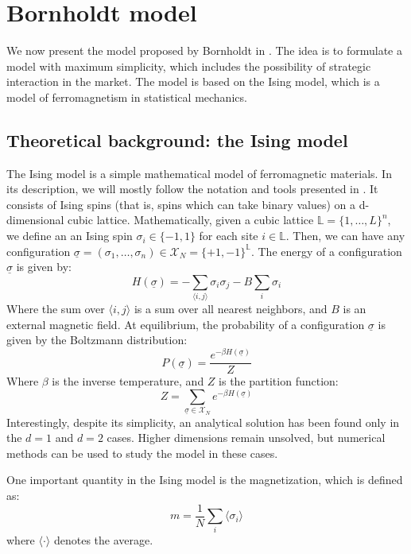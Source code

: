 \chapter{Bornholdt model}\label{ch:chapter2}
We now present the model proposed by Bornholdt in \cite{bornholdt}. The idea is to formulate a model with maximum simplicity, which includes the possibility of strategic interaction in the market. The model is based on the Ising model, which is a model of ferromagnetism in statistical mechanics.

\section{Theoretical background: the Ising model}
The Ising model is a simple mathematical model of ferromagnetic materials. In its description, we will mostly follow the notation and tools presented in \cite{mezard_book}. It consists of Ising spins (that is, spins which can take binary values) on a d-dimensional cubic lattice. Mathematically, given a cubic lattice $\mathbb{L}=\{1,\dots,L\}^n$, we define an an Ising spin $\sigma_i\in\{-1,1\}$ for each site $i\in\mathbb{L}$. Then, we can have any configuration $\underline{\sigma} = (\sigma_1,\dots,\sigma_n) \in \mathcal{X}_N=\{+1,-1\}^{\mathbb{L}}$. The energy of a configuration $\underline{\sigma}$ is given by:
\begin{equation}
    H(\underline{\sigma}) = -\sum_{\langle i,j\rangle}\sigma_i\sigma_j - B\sum_i \sigma_i
\end{equation}
Where the sum over $\langle i,j\rangle$ is a sum over all nearest neighbors, and $B$ is an external magnetic field. At equilibrium, the probability of a configuration $\underline{\sigma}$ is given by the Boltzmann distribution:
\begin{equation}
    P(\underline{\sigma}) = \frac{e^{-\beta H(\underline{\sigma})}}{Z}
\end{equation}
Where $\beta$ is the inverse temperature, and $Z$ is the partition function:
\begin{equation}
    Z = \sum_{\underline{\sigma}\in\mathcal{X}_N}e^{-\beta H(\underline{\sigma})}
\end{equation}
Interestingly, despite its simplicity, an analytical solution has been found only in the $d=1$ and $d=2$ cases. Higher dimensions remain unsolved, but numerical methods can be used to study the model in these cases.

One important quantity in the Ising model is the magnetization, which is defined as:
\begin{equation}
    m = \frac{1}{N}\sum_i \langle \sigma_i \rangle
\end{equation}
where $\langle \cdot \rangle$ denotes the average.

